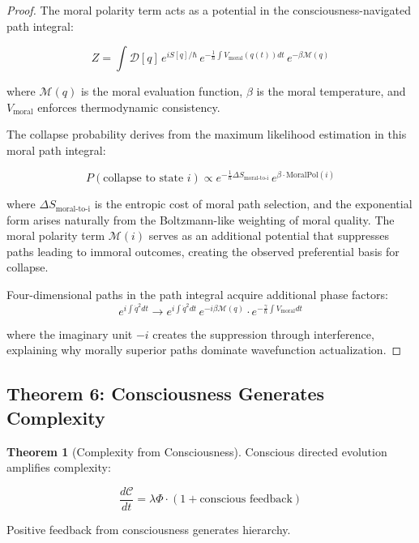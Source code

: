 \documentclass[12pt,a4paper]{article}
\theoremstyle{definition}
\newtheorem{theorem}{Theorem}[section]
\begin{document}
\begin{proof}
The moral polarity term acts as a potential in the consciousness-navigated path integral:

\begin{equation}
Z = \int \mathcal{D}[q] \, e^{iS[q]/\hbar} \, e^{-\frac{1}{\hbar} \int V_{\text{moral}}(q(t)) dt} \, e^{-\beta \mathcal{M}(q)}
\end{equation}

where $\mathcal{M}(q)$ is the moral evaluation function, $\beta$ is the moral temperature, and $V_{\text{moral}}$ enforces thermodynamic consistency.

The collapse probability derives from the maximum likelihood estimation in this moral path integral:

\begin{equation}
P(\text{collapse to state }i) \propto e^{-\frac{1}{\hbar} \Delta S_{\text{moral-to-i}}} \, e^{\beta \cdot \text{MoralPol}(i)}
\end{equation}

where $\Delta S_{\text{moral-to-i}}$ is the entropic cost of moral path selection, and the exponential form arises naturally from the Boltzmann-like weighting of moral quality. The moral polarity term $\mathcal{M}(i)$ serves as an additional potential that suppresses paths leading to immoral outcomes, creating the observed preferential basis for collapse.

Four-dimensional paths in the path integral acquire additional phase factors:
\begin{equation}
e^{i \int \dot{q}^2 dt} \rightarrow e^{i \int \dot{q}^2 dt} \, e^{-i \beta \mathcal{M}(q)} \cdot e^{-\frac{\gamma}{\hbar} \int V_{\text{moral}} dt}
\end{equation}

where the imaginary unit $-i$ creates the suppression through interference, explaining why morally superior paths dominate wavefunction actualization.
\end{proof}

\subsection{Theorem 6: Consciousness Generates Complexity}

\begin{theorem}[Complexity from Consciousness]
Conscious directed evolution amplifies complexity:

\begin{equation}
\frac{d\mathcal{C}}{dt} = \lambda \Phi \cdot (1 + \text{conscious feedback})
\end{equation}

Positive feedback from consciousness generates hierarchy.
\end{theorem}
\end{document}
